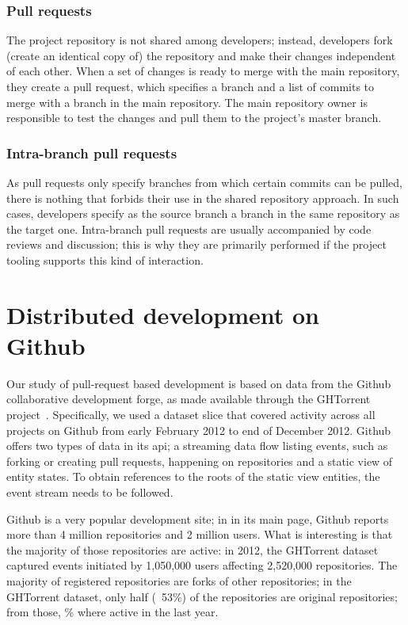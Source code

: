 \documentclass[conference]{IEEEtran}
\begin{document}
\subsubsection{Pull requests} The project repository is not shared among
developers; instead, developers fork (create an identical copy of) the
repository and make their changes independent of each other. When a set of
changes is ready to merge with the main repository, they create a pull request,
which specifies a branch and a list of commits to merge with a branch in the
main repository. The main repository owner is responsible to test the changes
and pull them to the project's master branch. 

\subsubsection{Intra-branch pull requests} As pull requests only specify branches
from which certain commits can be pulled, there is nothing that forbids their
use in the shared repository approach. In such cases, developers specify as the
source branch a branch in the same repository as the target one. Intra-branch
pull requests are usually accompanied by code reviews and discussion; this is
why they are primarily performed if the project tooling supports this kind of
interaction.

\section{Distributed development on Github}

Our study of pull-request based development is based on data from the Github
collaborative development forge, as made available through the GHTorrent
project~\cite{GS12}. Specifically, we used a dataset slice that covered activity
across all projects on Github from early February 2012 to end of December 2012.
Github offers two types of data in its {\sc api}; a streaming data flow listing
events, such as forking or creating pull requests, happening on repositories and
a static view of entity states. To obtain references to the roots of the static
view entities, the event stream needs to be followed.

Github is a very popular development site;
in in its main page, Github reports more than 4 million repositories and 2 
million users. What is interesting is that the majority of those repositories are
active: in 2012, the GHTorrent dataset captured events initiated by  
1,050,000 users affecting 
2,520,000 repositories. 
The majority of registered repositories are forks of other 
repositories; in the GHTorrent dataset, only half
(~53\%) of the repositories are original repositories;
from those, \% where active in the last year.
\end{document}
